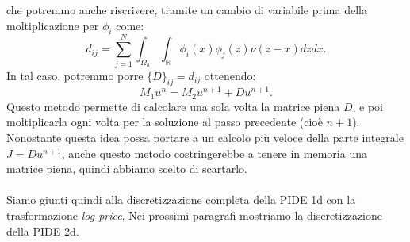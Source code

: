 \documentclass[a4paper,10pt]{report}
\theoremstyle{plain}
\theoremstyle{definition}
\theoremstyle{remark}
\begin{document}
che potremmo anche riscrivere, tramite un cambio di variabile prima della moltiplicazione per $\phi_i$ come: $$d_{ij}=\sum_{j=1}^N  \int_{\Omega_h} \int_{\mathbb{R}} \phi_i(x)\phi_j(z)\nu(z-x)dzdx.$$In tal caso, potremmo porre $\{D\}_{ij}=d_{ij}$ ottenendo:$$M_1u^n=M_2u^{n+1}+Du^{n+1}.$$Questo metodo permette di calcolare una sola volta la matrice piena $D$, e poi moltiplicarla ogni volta per la soluzione al passo precedente (cio\`e $n+1$). Nonostante questa idea possa portare a un calcolo pi\`u veloce della parte integrale $J=Du^{n+1}$, anche questo metodo costringerebbe a tenere in memoria una matrice piena, quindi abbiamo scelto di scartarlo.\\\\Siamo giunti quindi alla discretizzazione completa della PIDE 1d con la trasformazione \emph{log-price}. Nei prossimi paragrafi mostriamo la discretizzazione della PIDE 2d.
\end{document}
